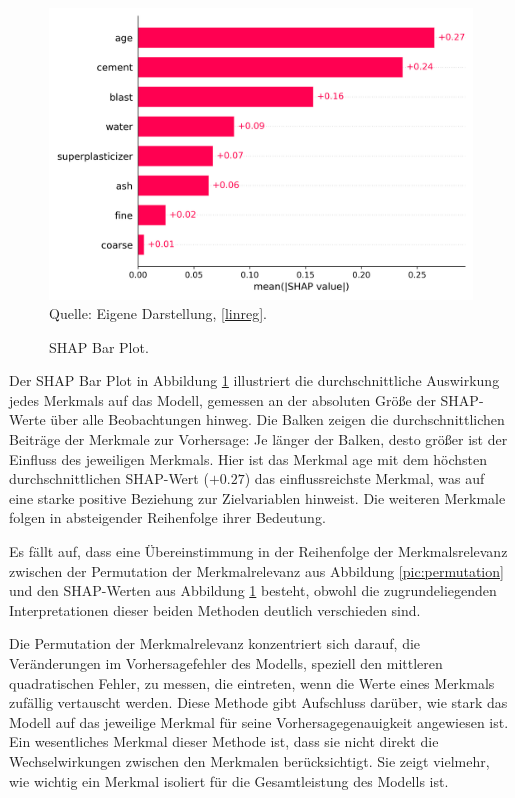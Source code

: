 \begin{figure}[!h]
    \caption{SHAP Bar Plot.}
    \includegraphics[width=1\textwidth]{../scripts/images/shap_bar_plot.png}
    Quelle: Eigene Darstellung, \ref{linreg}.
    \label{pic:shap_bar}
\end{figure}

Der SHAP Bar Plot in Abbildung \ref{pic:shap_bar} illustriert die durchschnittliche 
Auswirkung jedes Merkmals auf das Modell, gemessen an der absoluten Größe der SHAP-Werte 
über alle Beobachtungen hinweg. Die Balken zeigen die durchschnittlichen Beiträge der 
Merkmale zur Vorhersage: Je länger der Balken, desto größer ist der Einfluss des jeweiligen Merkmals. 
Hier ist das Merkmal age mit dem höchsten durchschnittlichen SHAP-Wert ($+0.27$) das einflussreichste 
Merkmal, was auf eine starke positive Beziehung zur Zielvariablen hinweist. Die weiteren Merkmale 
folgen in absteigender Reihenfolge ihrer Bedeutung.

Es fällt auf, dass eine Übereinstimmung in der Reihenfolge der Merkmalsrelevanz zwischen 
der Permutation der Merkmalrelevanz aus Abbildung \ref{pic:permutation} und den SHAP-Werten aus Abbildung \ref{pic:shap_bar}
besteht, obwohl die zugrundeliegenden Interpretationen dieser beiden Methoden deutlich verschieden sind. 

Die Permutation der Merkmalrelevanz konzentriert sich darauf, die Veränderungen im Vorhersagefehler des Modells, 
speziell den mittleren quadratischen Fehler, zu messen, die eintreten, wenn die Werte eines Merkmals zufällig vertauscht werden. 
Diese Methode gibt Aufschluss darüber, wie stark das Modell auf das jeweilige Merkmal für seine Vorhersagegenauigkeit angewiesen ist. 
Ein wesentliches Merkmal dieser Methode ist, dass sie nicht direkt die Wechselwirkungen zwischen den Merkmalen berücksichtigt. 
Sie zeigt vielmehr, wie wichtig ein Merkmal isoliert für die Gesamtleistung des Modells ist.

